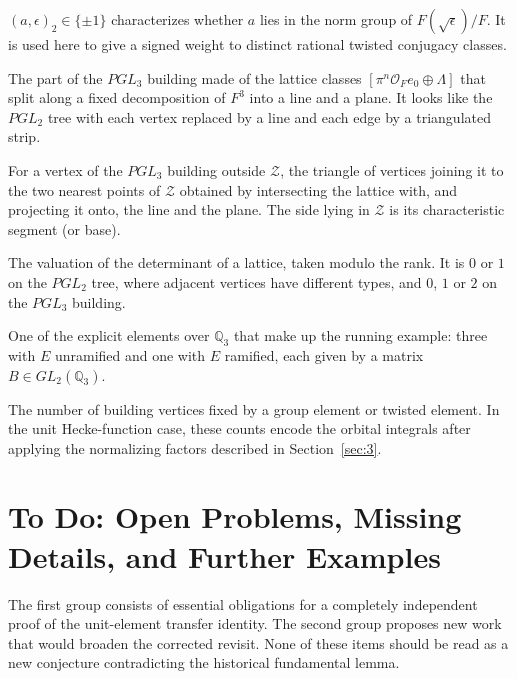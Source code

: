 \documentclass[12pt,letterpaper]{amsart}
\numberwithin{equation}{section}
\theoremstyle{definition}
\theoremstyle{plain}
\begin{document}
\begin{description}
$(a,\epsilon)_2\in\{\pm1\}$ characterizes whether $a$ lies in
the norm group of $F(\sqrt\epsilon)/F$. It is used here to give a
signed weight to distinct rational twisted conjugacy classes.
\item[Levi subcomplex $\mathcal Z$.] The part of the $PGL_3$ building
made of the lattice classes
$[\pi^n\mathcal O_Fe_0\oplus\Lambda]$ that split along a fixed
decomposition of $F^3$ into a line and a plane. It looks like the
$PGL_2$ tree with each vertex replaced by a line and each edge by a
triangulated strip.
\item[Characteristic leaf.] For a vertex of the $PGL_3$ building
outside $\mathcal Z$, the triangle of vertices joining it to the two
nearest points of $\mathcal Z$ obtained by intersecting the lattice
with, and projecting it onto, the line and the plane. The side lying
in $\mathcal Z$ is its characteristic segment (or base).
\item[Vertex type.] The valuation of the determinant of a lattice,
taken modulo the rank. It is $0$ or $1$ on the $PGL_2$ tree, where
adjacent vertices have different types, and $0$, $1$ or $2$ on the
$PGL_3$ building.
\item[Specimen.] One of the explicit elements over $\mathbb Q_3$ that
make up the running example: three with $E$ unramified and one with
$E$ ramified, each given by a matrix $B\in GL_2(\mathbb Q_3)$.
\item[Fixed vertex count.] The number of building vertices fixed by a
group element or twisted element. In the unit Hecke-function case,
these counts encode the orbital integrals after applying the
normalizing factors described in Section~\ref{sec:3}.
\end{description}


\section{To Do: Open Problems, Missing Details, and Further Examples}
\label{sec:new-todo}

The first group consists of essential obligations for a completely
independent proof of the unit-element transfer identity. The second
group proposes new work that would broaden the corrected revisit.
None of these items should be read as a new conjecture contradicting
the historical fundamental lemma.
\end{document}
